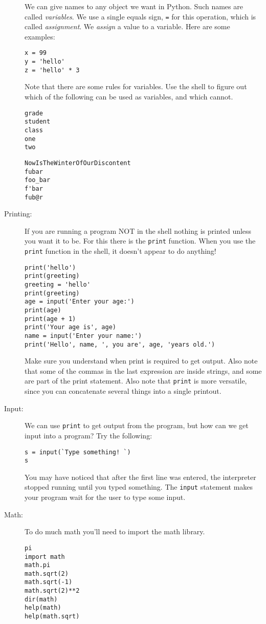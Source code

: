\documentclass[12pt]{article}
\begin{document}
\begin{description}
We can give names to any object we want in Python.
Such names are called {\em variables}.
We use a single equals sign, \verb|=| for this operation,
which is called {\em assignment}.  We {\em assign}
a value to a variable.
Here are some examples:
\begin{Verbatim}[frame=single]
x = 99
y = 'hello'
z = 'hello' * 3
\end{Verbatim}
Note that there are some rules for variables.
Use the shell to figure out which of the following
can be used as variables, and which cannot.
\begin{multicols}{2}
\begin{Verbatim}[frame=single]
grade
student
class
one
two 
\end{Verbatim}
\begin{Verbatim}[frame=single]
NowIsTheWinterOfOurDiscontent
fubar
foo_bar
f'bar
fub@r
\end{Verbatim}
\end{multicols}

\item[Printing:] If you are running a program NOT in the
shell nothing is printed unless you want it to be.
For this there is the \verb|print| function.
When you use the \verb|print| function in the shell,
it doesn't appear to do anything!
\begin{Verbatim}[frame=single]
print('hello')
print(greeting)
greeting = 'hello'
print(greeting)
age = input('Enter your age:')
print(age)
print(age + 1)
print('Your age is', age)
name = input('Enter your name:')
print('Hello', name, ', you are', age, 'years old.')
\end{Verbatim}
Make sure you understand when print is required
to get output.  Also note that some of the
commas in the last expression are inside strings,
and some are part of the print statement.
Also note that \verb|print| is more versatile,
since you can concatenate several things into 
a single printout.

\item[Input:]  
We can use \verb|print| to get output from the
program, but how can we get input into a program?
Try the following:
\begin{Verbatim}[frame=single]
s = input(`Type something! `)
s
\end{Verbatim}
You may have noticed that after the first line
was entered, the interpreter stopped running until you
typed something.  The \verb|input| statement makes
your program wait for the user to type some input.

\item[Math:]  To do much math you'll need to
import the math library.
\begin{Verbatim}[frame=single]
pi
import math
math.pi
math.sqrt(2)
math.sqrt(-1)
math.sqrt(2)**2
dir(math)
help(math)
help(math.sqrt)
\end{Verbatim}


\end{description}
\end{document}
